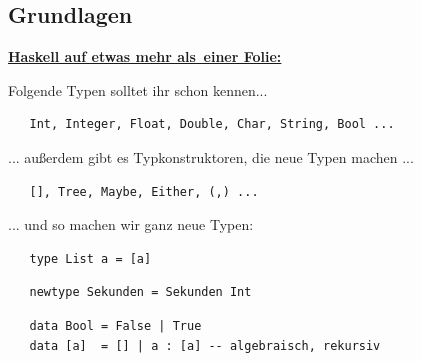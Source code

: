 \documentclass[unknownkeysallowed]{beamer}
\begin{document}
  \subsection{Grundlagen}
  \begin{frame}[fragile]
  
  \Large\textbf{\underline{Haskell auf \tiny etwas mehr als \,\Large einer Folie:}} \bigskip \normalsize
  
  Folgende Typen solltet ihr schon kennen...
  
  \begin{verbatim}
   Int, Integer, Float, Double, Char, String, Bool ...
  \end{verbatim}
  
  \pause
  
  ... außerdem gibt es Typkonstruktoren, die neue Typen machen ...
  
  \begin{verbatim}
   [], Tree, Maybe, Either, (,) ...
  \end{verbatim}
  
  \pause
  
  ... und so machen wir ganz neue Typen:

  \begin{verbatim}
   type List a = [a]
  \end{verbatim}
  
  \pause  
   
  \begin{verbatim}
   newtype Sekunden = Sekunden Int
  \end{verbatim}
  
  \pause
  
  \begin{verbatim}
   data Bool = False | True
   data [a]  = [] | a : [a] -- algebraisch, rekursiv
  \end{verbatim}
  
\end{frame}

\end{document}
